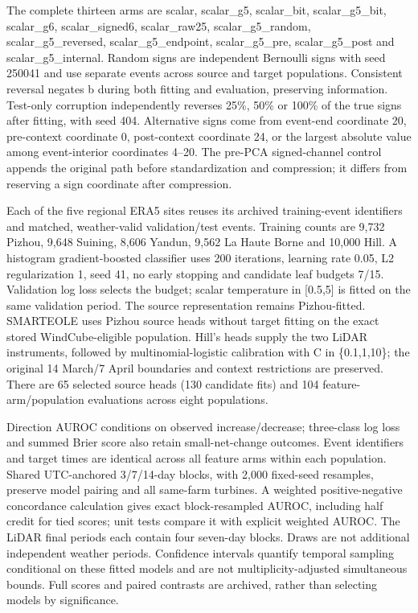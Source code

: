 \documentclass[a4paper,11pt]{article}
\begin{document}
The complete thirteen arms are scalar, scalar\_\allowbreak{}g5, scalar\_\allowbreak{}bit, scalar\_\allowbreak{}g5\_\allowbreak{}bit, scalar\_\allowbreak{}g6, scalar\_\allowbreak{}signed6, scalar\_\allowbreak{}raw25, scalar\_\allowbreak{}g5\_\allowbreak{}random, scalar\_\allowbreak{}g5\_\allowbreak{}reversed, scalar\_\allowbreak{}g5\_\allowbreak{}endpoint, scalar\_\allowbreak{}g5\_\allowbreak{}pre, scalar\_\allowbreak{}g5\_\allowbreak{}post and scalar\_\allowbreak{}g5\_\allowbreak{}internal. Random signs are independent Bernoulli signs with seed 250041 and use separate events across source and target populations. Consistent reversal negates b during both fitting and evaluation, preserving information. Test-only corruption independently reverses 25\%, 50\% or 100\% of the true signs after fitting, with seed 404. Alternative signs come from event-end coordinate 20, pre-context coordinate 0, post-context coordinate 24, or the largest absolute value among event-interior coordinates 4--20. The pre-PCA signed-channel control appends the original path before standardization and compression; it differs from reserving a sign coordinate after compression.

Each of the five regional ERA5 sites reuses its archived training-event identifiers and matched, weather-valid validation/test events. Training counts are 9,732 Pizhou, 9,648 Suining, 8,606 Yandun, 9,562 La Haute Borne and 10,000 Hill. A histogram gradient-boosted classifier uses 200 iterations, learning rate 0.05, L2 regularization 1, seed 41, no early stopping and candidate leaf budgets 7/15. Validation log loss selects the budget; scalar temperature in {[}0.5,5{]} is fitted on the same validation period. The source representation remains Pizhou-fitted. SMARTEOLE uses Pizhou source heads without target fitting on the exact stored WindCube-eligible population. Hill's heads supply the two LiDAR instruments, followed by multinomial-logistic calibration with C in \{0.1,1,10\}; the original 14 March/7 April boundaries and context restrictions are preserved. There are 65 selected source heads (130 candidate fits) and 104 feature-arm/population evaluations across eight populations.

Direction AUROC conditions on observed increase/decrease; three-class log loss and summed Brier score also retain small-net-change outcomes. Event identifiers and target times are identical across all feature arms within each population. Shared UTC-anchored 3/7/14-day blocks, with 2,000 fixed-seed resamples, preserve model pairing and all same-farm turbines. A weighted positive-negative concordance calculation gives exact block-resampled AUROC, including half credit for tied scores; unit tests compare it with explicit weighted AUROC. The LiDAR final periods each contain four seven-day blocks. Draws are not additional independent weather periods. Confidence intervals quantify temporal sampling conditional on these fitted models and are not multiplicity-adjusted simultaneous bounds. Full scores and paired contrasts are archived, rather than selecting models by significance.
\end{document}
